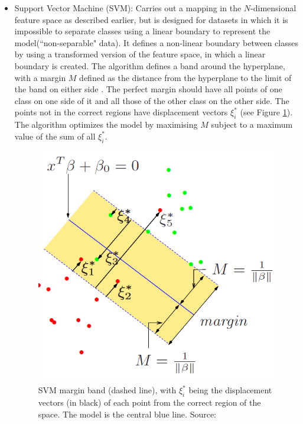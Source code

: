 \documentclass[12pt]{article}
\begin{document}
\begin{itemize}
\item Support Vector Machine (SVM): Carries out a mapping in the $N$-dimensional feature space as described earlier, but is designed for datasets in which it is impossible to separate classes using a linear boundary to represent the model(``non-separable" data). It defines a non-linear boundary between classes by using a transformed version of the feature space, in which a linear boundary is created. The algorithm defines a band around the hyperplane, with a margin $M$ defined as the distance from the hyperplane to the limit of the band on either side \cite{friedman2001elements}. The perfect margin should have all points of one class on one side of it and all those of the other class on the other side. The points not in the correct regions have displacement vectors $\xi_{i}^{*}$ (see Figure \ref{svm}). The algorithm optimizes the model by maximising $M$ subject to a maximum value of the sum of all $\xi_{i}^{*}$.

\begin{figure}[h!]
\begin{center}
\includegraphics[scale=0.5]{svm.png}
\caption{SVM margin band (dashed line), with $\xi_{i}^{*}$ being the displacement vectors (in black) of each point from the correct region of the space. The model is the central blue line. Source: \cite{friedman2001elements}}
\label{svm}
\end{center}
\end{figure}


\end{itemize}
\end{document}
